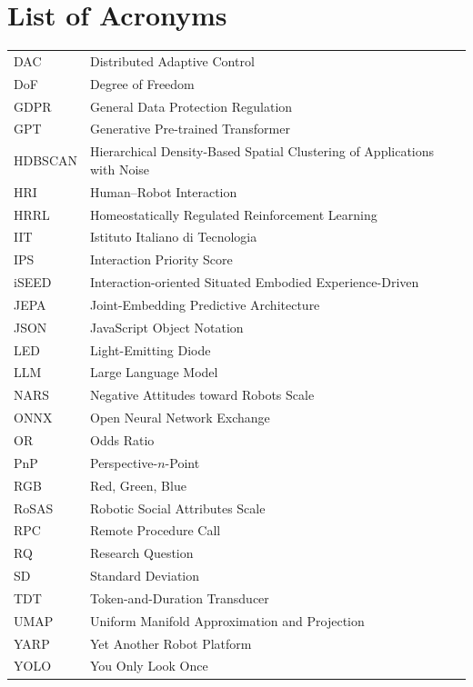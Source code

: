 \chapter*{List of Acronyms}

\begin{tabular}{@{}p{}>{\raggedright\arraybackslash}p{}@{}}
DAC & Distributed Adaptive Control \\
DoF & Degree of Freedom \\
GDPR & General Data Protection Regulation \\
GPT & Generative Pre-trained Transformer \\
HDBSCAN & Hierarchical Density-Based Spatial Clustering of Applications with Noise \\
HRI & Human--Robot Interaction \\
HRRL & Homeostatically Regulated Reinforcement Learning \\
IIT & Istituto Italiano di Tecnologia \\
IPS & Interaction Priority Score \\
iSEED & Interaction-oriented Situated Embodied Experience-Driven \\
JEPA & Joint-Embedding Predictive Architecture \\
JSON & JavaScript Object Notation \\
LED & Light-Emitting Diode \\
LLM & Large Language Model \\
NARS & Negative Attitudes toward Robots Scale \\
ONNX & Open Neural Network Exchange \\
OR & Odds Ratio \\
PnP & Perspective-$n$-Point \\
RGB & Red, Green, Blue \\
RoSAS & Robotic Social Attributes Scale \\
RPC & Remote Procedure Call \\
RQ & Research Question \\
SD & Standard Deviation \\
TDT & Token-and-Duration Transducer \\
UMAP & Uniform Manifold Approximation and Projection \\
YARP & Yet Another Robot Platform \\
YOLO & You Only Look Once \\
\end{tabular}
